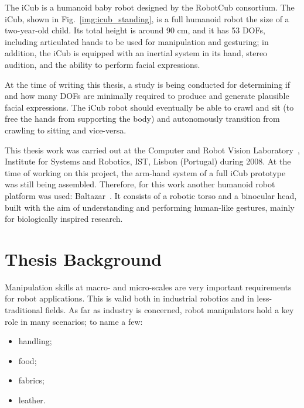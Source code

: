 

The iCub\label{icub} is a humanoid baby robot designed by the \ac{RobotCub} consortium. The iCub, shown in Fig.~\ref{img:icub_standing}, is a full humanoid robot the size of a two-year-old child. Its total height is around 90 cm, and it has 53 \acp{DOF}, including articulated hands to be used for manipulation and gesturing; in addition, the iCub is equipped with an inertial system in its hand, stereo audition, and the ability to perform facial expressions.

At the time of writing this thesis, a study is being conducted for determining if and how many \acp{DOF} are minimally required to produce and generate plausible facial expressions. The iCub robot should eventually be able to crawl and sit (to free the hands from supporting the body) and autonomously transition from crawling to sitting and vice-versa. 

This thesis work was carried out at the Computer and Robot Vision Laboratory~\cite{link:vislab}, Institute for Systems and Robotics, IST, Lisbon (Portugal) during 2008. At the time of working on this project, the arm-hand system of a full iCub prototype was still being assembled. Therefore, for this work another humanoid robot platform was used: Baltazar~\cite{lopes:2004, lopes:2007}. It consists of a robotic torso and a binocular head, built with the aim of understanding and performing human-like gestures, mainly for biologically inspired research.

\section{Thesis Background}

Manipulation skills at macro- and micro-scales are very important requirements for robot applications. This is valid both in industrial robotics and in less-traditional fields. As far as industry is concerned, robot manipulators hold a key role in many scenarios; to name a few:
\begin{itemize}
\item handling;

\item food;

\item fabrics;

\item leather.
\end{itemize}

